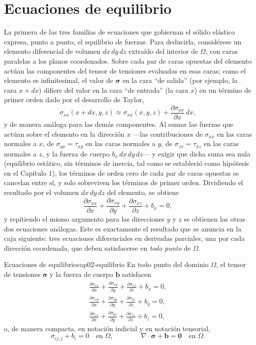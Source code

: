\section{Ecuaciones de equilibrio}
\label{sec:cap02-equilibrio}

La primera de las tres familias de ecuaciones que gobiernan el sólido elástico expresa, punto a punto, el equilibrio de fuerzas. Para deducirla, considérese un elemento diferencial de volumen $dx\,dy\,dz$ extraído del interior de $\Omega$, con caras paralelas a los planos coordenados. Sobre cada par de caras opuestas del elemento actúan las componentes del tensor de tensiones evaluadas en esas caras; como el elemento es infinitesimal, el valor de $\bm\sigma$ en la cara ``de salida'' (por ejemplo, la cara $x+dx$) difiere del valor en la cara ``de entrada'' (la cara $x$) en un término de primer orden dado por el desarrollo de Taylor,
\[
\sigma_{xx}(x+dx,y,z) \approx \sigma_{xx}(x,y,z) + \frac{\partial \sigma_{xx}}{\partial x}\,dx,
\]
y de manera análoga para las demás componentes. Al sumar las fuerzas que actúan sobre el elemento en la dirección $x$ —las contribuciones de $\sigma_{xx}$ en las caras normales a $x$, de $\sigma_{yx}=\tau_{xy}$ en las caras normales a $y$, de $\sigma_{zx}=\tau_{xz}$ en las caras normales a $z$, y la fuerza de cuerpo $b_x\,dx\,dy\,dz$— y exigir que dicha suma sea nula (equilibrio estático, sin términos de inercia, tal como se estableció como hipótesis en el Capítulo 1), los términos de orden cero de cada par de caras opuestas se cancelan entre sí, y solo sobreviven los términos de primer orden. Dividiendo el resultado por el volumen $dx\,dy\,dz$ del elemento, se obtiene
\[
\frac{\partial \sigma_{xx}}{\partial x} + \frac{\partial \sigma_{xy}}{\partial y} + \frac{\partial \sigma_{xz}}{\partial z} + b_x = 0,
\]
y repitiendo el mismo argumento para las direcciones $y$ y $z$ se obtienen las otras dos ecuaciones análogas. Este es exactamente el resultado que se anuncia en la caja siguiente: tres ecuaciones diferenciales en derivadas parciales, una por cada dirección coordenada, que deben satisfacerse en \emph{todo punto} de $\Omega$.

\begin{ecnimportante}{Ecuaciones de equilibrio}{cap02-equilibrio}
En todo punto del dominio $\Omega$, el tensor de tensiones $\bm\sigma$ y la fuerza de cuerpo $\bm b$ satisfacen
\[
\begin{gathered}
\frac{\partial \sigma_{xx}}{\partial x} + \frac{\partial \sigma_{xy}}{\partial y} + \frac{\partial \sigma_{xz}}{\partial z} + b_x = 0, \\[4pt]
\frac{\partial \sigma_{xy}}{\partial x} + \frac{\partial \sigma_{yy}}{\partial y} + \frac{\partial \sigma_{yz}}{\partial z} + b_y = 0, \\[4pt]
\frac{\partial \sigma_{xz}}{\partial x} + \frac{\partial \sigma_{yz}}{\partial y} + \frac{\partial \sigma_{zz}}{\partial z} + b_z = 0,
\end{gathered}
\]
o, de manera compacta, en notación indicial y en notación tensorial,
\[
\sigma_{ij,j} + b_i = 0 \quad \text{en } \Omega, \qquad\qquad \nabla\cdot\bm\sigma + \bm b = \bm 0 \quad \text{en } \Omega.
\]
\end{ecnimportante}

